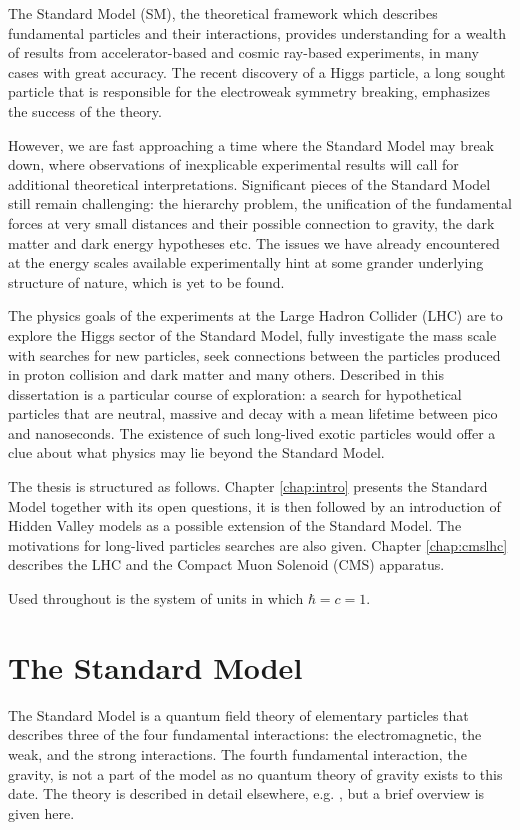 The Standard Model (SM), the theoretical framework which describes fundamental particles
and their interactions, provides understanding for a wealth of results from accelerator-based
and cosmic ray-based experiments, in many cases with great accuracy.
The recent discovery of a Higgs particle, a long sought particle that is responsible for
the electroweak symmetry 
breaking, emphasizes the success of the theory.

However, we are fast approaching a time where the Standard Model may break down,
where observations of inexplicable experimental results will call for additional theoretical 
interpretations. Significant pieces of the Standard Model still remain challenging: the hierarchy
problem, the unification of the fundamental forces at very small distances and their possible
connection to gravity, the dark matter and dark energy hypotheses etc.
The issues we have already encountered at the energy scales available experimentally 
hint at some grander underlying structure of nature, which is yet to be found.

The physics goals of the experiments at the Large Hadron Collider (LHC) are to explore
the Higgs sector of the Standard Model, fully investigate the \TeV mass scale with searches
for new particles, seek connections between the particles 
produced in proton collision and dark matter and many others. 
Described in this dissertation is a particular course of exploration: a search for hypothetical
particles that are neutral, 
massive and decay with a mean lifetime between pico and nanoseconds. The existence
of such long-lived exotic
particles would offer a clue about what physics may lie beyond the Standard Model.

The thesis is structured as follows. Chapter \ref{chap:intro}
 presents the Standard Model together with its
open questions, it is then followed by an introduction of Hidden Valley models as a possible
 extension of the Standard Model. The motivations for long-lived particles searches are also 
given.
Chapter \ref{chap:cmslhc} describes the LHC and the Compact Muon Solenoid (CMS) apparatus.

Used throughout is the system of units in which $\hbar=c=1$.


\section{The Standard Model}

The Standard Model is a quantum field theory of elementary particles that describes 
three of the four fundamental interactions: 
the electromagnetic, the weak, and the strong interactions. The fourth fundamental
interaction, the gravity, 
is not a part of the model as no quantum theory of gravity exists to this date. 
The theory is described in detail elsewhere, e.g. \cite{Tully:1417476}, 
but a brief overview is given here.

